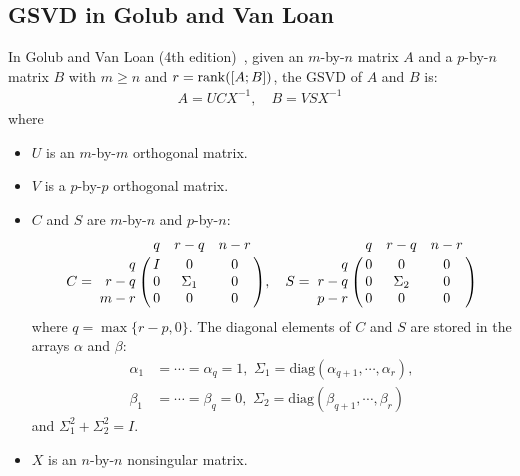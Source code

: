 \newpage 
\subsection{GSVD in Golub and Van Loan}
In Golub and Van Loan (4th edition)~\cite[pp.~309]{golub2013matrix}, 
given an $m$-by-$n$ matrix $A$ and a $p$-by-$n$ matrix $B$ with 
$m \ge n$ and $r = \operatorname{rank}([A; B])$, the GSVD of $A$ and $B$ is:
\begin{align} \label{eq:gsvdbyvanloan} 
A = UCX^{-1}, \quad B = VSX^{-1}  
\end{align}
where
\begin{itemize}
\item $U$ is an $m$-by-$m$ orthogonal matrix.

\item $V$ is a $p$-by-$p$ orthogonal matrix.

\item $C$ and $S$ are $m$-by-$n$ and $p$-by-$n$: 
\[
            C = \bordermatrix{ & q & r-q & n-r  \cr
            \hfill q & I & 0 & 0\cr
            \hfill r-q & 0 & \Sigma_1 & 0\cr
            \hfill m-r & 0 & 0 & 0}, \quad
            S = \bordermatrix{ & q & r-q & n-r \cr
            \hfill q & 0 & 0 & 0\cr
            \hfill r-q & 0 & \Sigma_2 & 0\cr
            \hfill p-r & 0 & 0 & 0}
\]
where $q = \max\{r-p, 0\}$. 
The diagonal elements of $C$ and $S$ are stored in the arrays
$\alpha$ and $\beta$: 
\begin{align*} 
\alpha_1 & = \cdots = \alpha_q = 1,\,\, 
\Sigma_1 = \mbox{diag}(\alpha_{q+1}, \cdots, \alpha_r), \\
\beta_1 & = \cdots = \beta_q = 0, \,\, 
\Sigma_2 = \mbox{diag}(\beta_{q+1}, \cdots, \beta_r)
\end{align*}
and $\Sigma_1^2 + \Sigma_2^2 = I$.

\item $X$ is an $n$-by-$n$ nonsingular matrix. 
\end{itemize}

